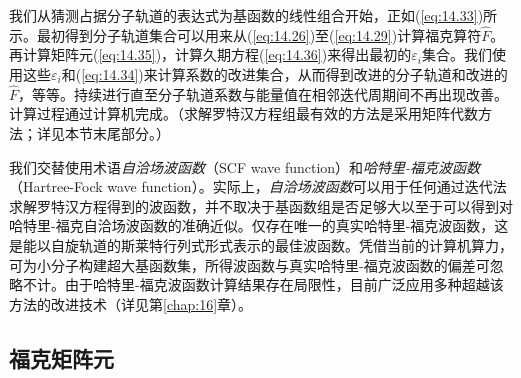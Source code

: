     我们从猜测占据分子轨道的表达式为基函数的线性组合开始，正如(\ref{eq:14.33})所示。最初得到分子轨道集合可以用来从(\ref{eq:14.26})至(\ref{eq:14.29})计算福克算符$\hat{F}$。再计算矩阵元(\ref{eq:14.35})，计算久期方程(\ref{eq:14.36})来得出最初的$\varepsilon_i$集合。我们使用这些$\varepsilon_i$和(\ref{eq:14.34})来计算系数的改进集合，从而得到改进的分子轨道和改进的$\hat{F}$，等等。持续进行直至分子轨道系数与能量值在相邻迭代周期间不再出现改善。计算过程通过计算机完成。（求解罗特汉方程组最有效的方法是采用矩阵代数方法；详见本节末尾部分。）

    我们交替使用术语\textit{自洽场波函数}（SCF wave function）和\textit{哈特里-福克波函数}（Hartree-Fock wave function）。实际上，\textit{自洽场波函数}可以用于任何通过迭代法求解罗特汉方程得到的波函数，并不取决于基函数组是否足够大以至于可以得到对哈特里-福克自洽场波函数的准确近似。仅存在唯一的真实哈特里-福克波函数，这是能以自旋轨道的斯莱特行列式形式表示的最佳波函数。凭借当前的计算机算力，可为小分子构建超大基函数集，所得波函数与真实哈特里-福克波函数的偏差可忽略不计。由于哈特里-福克波函数计算结果存在局限性，目前广泛应用多种超越该方法的改进技术（详见第\ref{chap:16}章）。

\subsection*{福克矩阵元}

